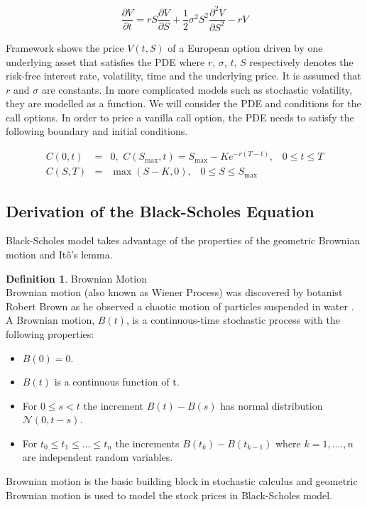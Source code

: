 \documentclass[12pt, oneside]{book}
\theoremstyle{plain}
\theoremstyle{definition}
\newtheorem{definition}[theorem]{Definition}
\begin{document}
\begin{equation}
\frac{\partial V}{\partial t} = rS\frac{\partial V}{\partial S}+\frac{1}{2} \sigma^2 S^2 \frac{\partial^2 V}{\partial S^2} - rV
\end{equation}

Framework shows the  price $V(t,S)$ of  a  European  option  driven  by  one underlying asset that satisfies the PDE where $r$, $\sigma$, $t$, $S$ respectively denotes the risk-free interest rate, volatility, time and the underlying price.  It is assumed that $r$ and $\sigma$ are constants. In more complicated models such as stochastic volatility, they are modelled as a function. We will consider the  PDE and conditions for the call options.  In order to price a vanilla call option, the PDE needs to satisfy the following boundary and initial conditions. 

\begin{eqnarray}
C(0,t) &=& 0, \hspace{4pt} C(S_{\max},t)=S_{\max} - K e^{-r(T-t)}, \hspace{10pt} 0 \leq t \leq T \\[10pt]
C(S,T) &=& \max(S-K,0), \hspace{10pt} 0 \leq S \leq S_{\max}
\end{eqnarray}

\subsection{Derivation of the Black-Scholes Equation}
Black-Scholes model takes advantage of the properties of the geometric Brownian motion and It\^{o}'s lemma. 

\begin{definition} Brownian Motion \\
Brownian motion (also known as Wiener Process) was discovered by botanist Robert Brown as he observed a chaotic motion of particles suspended in water \cite{BM}. A  Brownian  motion, $B(t)$,  is  a  continuous-time  stochastic  process  with  the  following properties: 
\begin{itemize}
\item $ B(0) = 0 $.
\item $ B(t) $ is a continuous function of t.
\item For $ 0  \leq s < t $ the increment $ B(t) -  B(s)  $ has normal distribution  $ \mathcal{N}(0, t-s) $.
\item  For $ t_0  \leq  t_1 \leq ... \leq  t_n $ the increments $ B(t_k) - B(t_{k-1}) $ where $k=1, .... ,n $ are independent random variables.
\end{itemize}    
Brownian motion is the basic building block in stochastic calculus and geometric Brownian motion is used to model the stock prices in Black-Scholes model.
\end{definition}
\end{document}
